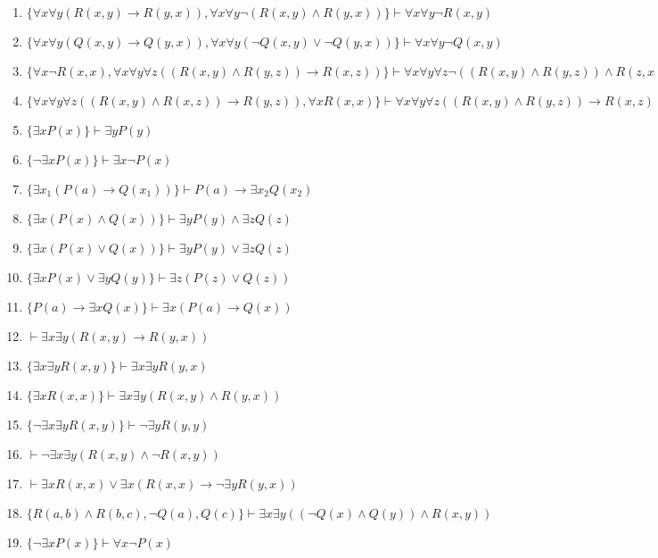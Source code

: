 \begin{enumerate}
    \item \(\{\forall x \forall y (R(x,y) \rightarrow R(y,x)), \forall x \forall y \neg (R(x,y) \wedge R(y,x))\} \vdash \forall x \forall y \neg R(x,y)\)
    \item \(\{\forall x \forall y (Q(x,y) \rightarrow Q(y,x)), \forall x \forall y (\neg Q(x,y) \vee \neg Q(y,x))\} \vdash \forall x \forall y \neg Q(x,y)\)
    \item \(\{\forall x \neg R(x,x), \forall x \forall y \forall z ((R(x,y) \wedge R(y,z)) \rightarrow R(x,z))\} \vdash \forall x \forall y \forall z \neg ((R(x,y) \wedge R(y,z)) \wedge R(z,x))\)
    \item \(\{\forall x \forall y \forall z ((R(x,y) \wedge R(x,z)) \rightarrow R(y,z)), \forall x R(x,x)\} \vdash \forall x \forall y \forall z ((R(x,y) \wedge R(y,z)) \rightarrow R(x,z))\)
    \item \(\{\exists x P(x)\} \vdash \exists y P(y)\)
    \item \(\{\neg \exists x P(x)\} \vdash \exists x \neg P(x)\)
    \item \(\{\exists x_1 (P(a) \rightarrow Q(x_1))\} \vdash P(a) \rightarrow \exists x_2 Q(x_2)\)
    \item \(\{\exists x (P(x) \wedge Q(x))\} \vdash \exists y P(y) \wedge \exists z Q(z)\)
    \item \(\{\exists x (P(x) \vee Q(x))\} \vdash \exists y P(y) \vee \exists z Q(z)\)
    \item \(\{\exists x P(x) \vee \exists y Q(y)\} \vdash \exists z (P(z) \vee Q(z))\)
    \item \(\{P(a) \rightarrow \exists x Q(x)\} \vdash \exists x (P(a) \rightarrow Q(x))\)
    \item \(\vdash \exists x \exists y (R(x,y) \rightarrow R(y,x))\)
    \item \(\{\exists x \exists y R(x,y)\} \vdash \exists x \exists y R(y,x)\)
    \item \(\{\exists x R(x,x)\} \vdash \exists x \exists y (R(x,y) \wedge R(y,x))\)
    \item \(\{\neg \exists x \exists y R(x,y)\} \vdash \neg \exists y R(y,y)\)
    \item \(\vdash \neg \exists x \exists y (R(x,y) \wedge \neg R(x,y))\)
    \item \(\vdash \exists x R(x,x) \vee \exists x (R(x,x) \rightarrow \neg \exists y R(y,x))\)
    \item \(\{R(a,b) \wedge R(b,c), \neg Q(a), Q(c)\} \vdash \exists x \exists y ((\neg Q(x) \wedge Q(y)) \wedge R(x,y))\)
    \item \(\{\neg \exists x P(x)\} \vdash \forall x \neg P(x)\)

\end{enumerate}
